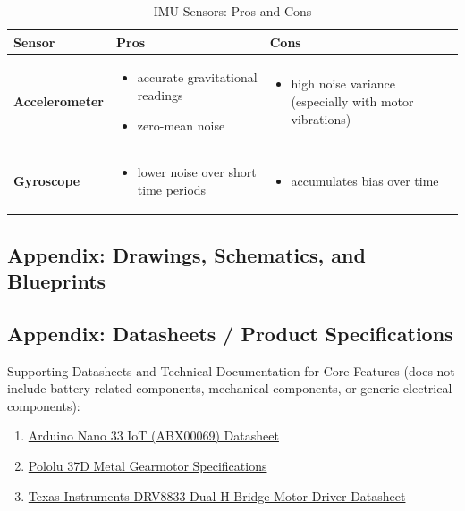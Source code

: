 \documentclass{article}
\begin{document}
\begin{table}[H]
    \centering
    \label{tab:imu_sensors}
    \begin{tabularx}{\textwidth}{|l|X|X|}
    \hline
    \textbf{Sensor} & \textbf{Pros} & \textbf{Cons} \\
    \hline
    \textbf{Accelerometer} &
    \begin{itemize}
        \item accurate gravitational readings
        \item zero-mean noise
    \end{itemize} &
    \begin{itemize}
        \item high noise variance (especially with motor vibrations)
    \end{itemize} \\
    \hline
    \textbf{Gyroscope} &
    \begin{itemize}
        \item lower noise over short time periods
    \end{itemize} &
    \begin{itemize}
        \item accumulates bias over time
    \end{itemize} \\
    \hline
    \end{tabularx}
    \caption{IMU Sensors: Pros and Cons}
\end{table}

\subsection{Appendix: Drawings, Schematics, and Blueprints}

\subsection{Appendix: Datasheets / Product Specifications}
Supporting Datasheets and Technical Documentation for Core Features (does not include battery related components, mechanical components, or generic electrical components):

\begin{enumerate}
    \item \href{https://docs.arduino.cc/resources/datasheets/ABX00069-datasheet.pdf}{Arduino Nano 33 IoT (ABX00069) Datasheet}
    \item \href{https://www.pololu.com/file/0J1736/pololu-37d-metal-gearmotors-rev-1-2.pdf}{Pololu 37D Metal Gearmotor Specifications}
    \item \href{https://www.ti.com/lit/ds/symlink/drv8833.pdf?ts=1743785858420}{Texas Instruments DRV8833 Dual H-Bridge Motor Driver Datasheet}
\end{enumerate}
\end{document}
